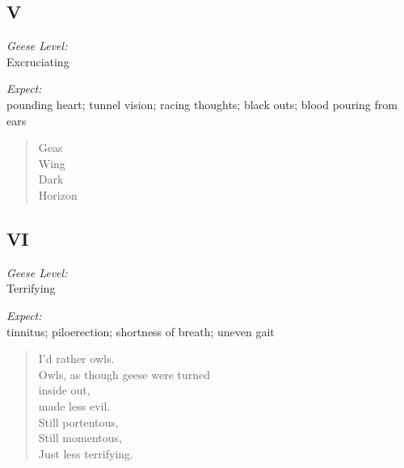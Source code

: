 \newpage

\subsection*{V}
\noindent\begin{paracol}{2}
    \begin{flushright}
      \textit{Geese Level:}\\
      Excruciating

      \textit{Expect:}\\
      pounding heart; tunnel vision; racing thoughts; black outs; blood pouring from ears
    \end{flushright}
    \switchcolumn
    \begin{verse}
      Geas \\
      \vin Wing \\
      \vin \vin Dark \\
      \vin \vin \vin Horizon
    \end{verse}
\end{paracol}

\newpage

\subsection*{VI}
\noindent\begin{paracol}{2}
    \begin{flushright}
      \textit{Geese Level:}\\
      Terrifying

      \textit{Expect:}\\
      tinnitus; piloerection; shortness of breath; uneven gait
    \end{flushright}
    \switchcolumn
    \begin{verse}
      I'd rather owls.\\
      Owls, as though geese were turned \\
      \vin inside out,\\
      \vin \vin made less evil.\\
      Still portentous,\\
      \vin Still momentous,\\
      \vin \vin Just less terrifying.
    \end{verse}
\end{paracol}

\newpage

